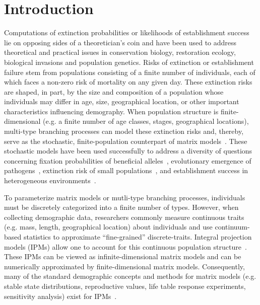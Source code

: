 \documentclass[12pt]{amsart}\usepackage[]{graphicx}\usepackage[]{color}
\begin{document}
\section*{Introduction}
Computations of extinction probabilities or likelihoods of establishment success lie on opposing sides of a theoretician's coin and have been used to address theoretical and practical issues in conservation biology, restoration ecology, biological invasions and population genetics. Risks of extinction or establishment failure stem from populations consisting of a finite number of individuals, each of which faces a non-zero risk of mortality on any given day. These extinction risks are shaped, in part, by the size and composition of a population whose individuals may differ in age, size, geographical location, or other important characteristics influencing demography. When population structure is finite-dimensional (e.g. a finite number of age classes, stages, geographical locations), multi-type branching processes can model these extinction risks and, thereby, serve as the stochastic, finite-population counterpart of matrix models~\citep{harris-63,athreya-ney-04,caswell-01,haccou-etal-05}. These stochastic models have been used successfully to address a diversity of questions concerning fixation probabilities of beneficial alleles~\citep{patwa-wahl-08}, evolutionary emergence of pathogens~\citep{antia-etal-03,ptrb-13}, extinction risk of small populations~\citep{boyce-92,gosselin-lebreton-00,fujiwara-caswell-01,erickson-etal-15}, and establishment success in heterogeneous environments~\citep{haccou-iwasa-96,haccou-vatunin-03,amnat-09b}.

To parameterize matrix models or mutli-type branching processes, individuals must be discretely categorized into a finite number of types. However, when collecting demographic data, researchers commonly measure continuous traits (e.g. mass, length, geographical location) about individuals and use continuum-based statistics to approximate ``fine-grained'' discrete-traits. Integral projection models (IPMs) allow one to account for this continuous population structure~\citep{easterling-etal-00}. These IPMs can be viewed as infinite-dimensional matrix models and can be numerically approximated by finite-dimensional matrix models. Consequently, many of the standard demographic concepts and methods for matrix models (e.g. stable state distributions, reproductive values, life table response experiments, sensitivity analysis) exist for IPMs~\citep{easterling-etal-00,ellner-rees-06,ellner-rees-07,rees-ellner-09,coulson-12,tpb-12,metcalf-etal-13,rees-etal-14,merow-etal-14}.
\end{document}
